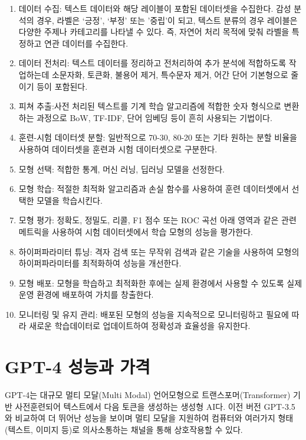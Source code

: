 \documentclass[
  letterpaper,
]{book}
\begin{document}
\begin{enumerate}
\def\labelenumi{\arabic{enumi}.}
\item
  데이터 수집: 텍스트 데이터와 해당 레이블이 포함된 데이터셋을 수집한다.
  감성 분석의 경우, 라벨은 `긍정', `부정' 또는 '중립'이 되고, 텍스트
  분류의 경우 레이블은 다양한 주제나 카테고리를 나타낼 수 있다. 즉,
  자연어 처리 목적에 맞춰 라벨을 특정하고 연관 데이터를 수집한다.
\item
  데이터 전처리: 텍스트 데이터를 정리하고 전처리하여 추가 분석에
  적합하도록 작업하는데 소문자화, 토큰화, 불용어 제거, 특수문자 제거,
  어간 단어 기본형으로 줄이기 등이 포함된다.
\item
  피쳐 추출:사전 처리된 텍스트를 기계 학습 알고리즘에 적합한 숫자
  형식으로 변환하는 과정으로 BoW, TF-IDF, 단어 임베딩 등이 흔히 사용되는
  기법이다.
\item
  훈련-시험 데이터셋 분할: 일반적으로 70-30, 80-20 또는 기타 원하는 분할
  비율을 사용하여 데이터셋을 훈련과 시험 데이터셋으로 구분한다.
\item
  모형 선택: 적합한 통계, 머신 러닝, 딥러닝 모델을 선정한다.
\item
  모형 학습: 적절한 최적화 알고리즘과 손실 함수를 사용하여 훈련
  데이터셋에서 선택한 모델을 학습시킨다.
\item
  모형 평가: 정확도, 정밀도, 리콜, F1 점수 또는 ROC 곡선 아래 영역과
  같은 관련 메트릭을 사용하여 시험 데이터셋에서 학습 모형의 성능을
  평가한다.
\item
  하이퍼파라미터 튜닝: 격자 검색 또는 무작위 검색과 같은 기술을 사용하여
  모형의 하이퍼파라미터를 최적화하여 성능을 개선한다.
\item
  모형 배포: 모형을 학습하고 최적화한 후에는 실제 환경에서 사용할 수
  있도록 실제 운영 환경에 배포하여 가치를 창출한다.
\item
  모니터링 및 유지 관리: 배포된 모형의 성능을 지속적으로 모니터링하고
  필요에 따라 새로운 학습데이터로 업데이트하여 정확성과 효율성을
  유지한다.
\end{enumerate}

\hypertarget{gpt-4-uxc131uxb2a5uxacfc-uxac00uxaca9}{%
\section{GPT-4 성능과
가격}\label{gpt-4-uxc131uxb2a5uxacfc-uxac00uxaca9}}

GPT-4는 대규모 멀티 모달(Multi Modal) 언어모형으로
트랜스포머(Transformer) 기반 사전훈련되어 텍스트에서 다음 토큰을
생성하는 생성형 AI다. 이전 버전 GPT-3.5와 비교하여 더 뛰어난 성능을
보이며 멀티 모달을 지원하여 컴퓨터와 여러가지 형태(텍스트, 이미지 등)로
의사소통하는 채널을 통해 상호작용할 수 있다.
\end{document}
